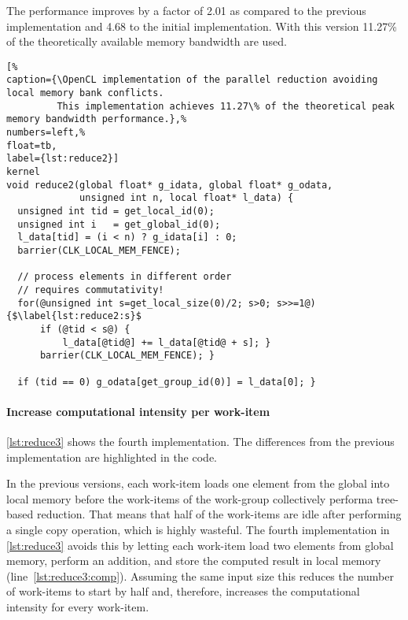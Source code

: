 The performance improves by a factor of 2.01 as compared to the previous implementation and 4.68 to the initial implementation.
With this version 11.27\% of the theoretically available memory bandwidth are used.


\begin{lstlisting}[%                                                             
caption={\OpenCL implementation of the parallel reduction avoiding local memory bank conflicts.
         This implementation achieves 11.27\% of the theoretical peak memory bandwidth performance.},%
numbers=left,%
float=tb,
label={lst:reduce2}]
kernel
void reduce2(global float* g_idata, global float* g_odata,
             unsigned int n, local float* l_data) {
  unsigned int tid = get_local_id(0);
  unsigned int i   = get_global_id(0);
  l_data[tid] = (i < n) ? g_idata[i] : 0;
  barrier(CLK_LOCAL_MEM_FENCE);

  // process elements in different order
  // requires commutativity!
  for(@unsigned int s=get_local_size(0)/2; s>0; s>>=1@) {$\label{lst:reduce2:s}$
      if (@tid < s@) {
          l_data[@tid@] += l_data[@tid@ + s]; }
      barrier(CLK_LOCAL_MEM_FENCE); }

  if (tid == 0) g_odata[get_group_id(0)] = l_data[0]; }
\end{lstlisting}

\newpage

\paragraph{Increase computational intensity per work-item}

\autoref{lst:reduce3} shows the fourth implementation.
The differences from the previous implementation are highlighted in the code.

In the previous versions, each work-item loads one element from the global into local memory before the work-items of the work-group collectively performa tree-based reduction.
That means that half of the work-items are idle after performing a single copy operation, which is highly wasteful.
The fourth implementation in \autoref{lst:reduce3} avoids this by letting each work-item load two elements from global memory, perform an addition, and store the computed result in local memory (line~\ref{lst:reduce3:comp}).
Assuming the same input size this reduces the number of work-items to start by half and, therefore, increases the computational intensity for every work-item.

